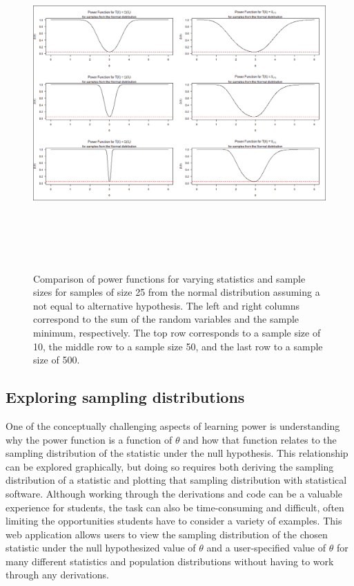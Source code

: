 \documentclass{TISE}
\begin{document}
\begin{figure}[H]
	\centering
	\includegraphics[height=5in, width=\linewidth]{fig9.png}
	\caption{Comparison of power functions for varying statistics and sample sizes for samples of size 25 from the normal distribution assuming a not equal to alternative hypothesis. The left and right columns correspond to the sum of the random variables and the sample minimum, respectively. The top row corresponds to a sample size of 10, the middle row to a sample size 50, and the last row to a sample size of 500.}
\end{figure}

\subsection{Exploring sampling distributions}

One of the conceptually challenging aspects of learning power is understanding why the power function is a function of $\theta$ and how that function relates to the sampling distribution of the statistic under the null hypothesis. This relationship can be explored graphically, but doing so requires both deriving the sampling distribution of a statistic and plotting that sampling distribution with statistical software. Although working through the derivations and code can be a valuable experience for students, the task can also be time-consuming and difficult, often limiting the opportunities students have to consider a variety of examples. This web application allows users to view the sampling distribution of the chosen statistic under the null hypothesized value of $\theta$ and a user-specified value of $\theta$ for many different statistics and population distributions without having to work through any derivations. 
\end{document}
